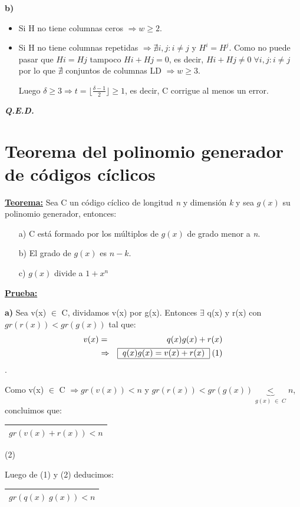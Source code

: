 \documentclass[12pt,a4paper]{report}
\newcounter{neq}
\newcommand{\QED}{\hfill \textit{\textbf{Q.E.D.}}}
\begin{document}
			\vspace{5mm}
			\textbf{b)}
			\begin{itemize}
				\item Si H no tiene columnas ceros $\Rightarrow w \geq 2$.
				\item Si H no tiene columnas repetidas $\Rightarrow \nexists i,j : i \neq j$ y $H^{i} = H^{j}$. Como no puede pasar que $H{i} = H{j}$ tampoco $H{i} + H{j} = 0$, es decir, $H{i} + H{j} \neq 0 \; \forall i,j : i \neq j$ por lo que $\nexists$ conjuntos de columnas LD $\Rightarrow w \geq 3$.

				\par Luego $\delta \geq 3 \Rightarrow t = \lfloor \frac{\delta-1}{2} \rfloor \geq 1$, es decir, C corrigue al menos un error.
			\end{itemize}

		\QED

	\section{Teorema del polinomio generador de códigos cíclicos}
		\textbf{\underline{Teorema:}} Sea C un código cíclico de longitud \textit{n} y  dimensión \textit{k} y sea $g(x)$ su polinomio generador, entonces:
			\begin{itemize}
				\item[a)] C está formado por los múltiplos de $g(x)$ de grado menor a \textit{n}.
				\item[b)] El grado de $g(x)$ es $n - k$.
				\item[c)] $g(x)$ divide a $1 + x^{n}$
			\end{itemize}

		\textbf{\underline{Prueba:}}
			\par \textbf{a)} Sea v(x) $\in$ C, dividamos v(x) por g(x). Entonces $\exists$ q(x) y r(x) con $gr(r(x)) < gr(g(x))$ tal que:
			\begin{eqnarray}
				\nonumber v(x) &=& q(x) g(x) + r(x) \\
				\nonumber & \Rightarrow & \begin{tabular}{|c|} \hline $q(x) g(x) = v(x) + r(x) $ \\ \hline \end{tabular} \; (1)
			\end{eqnarray}.

			\par Como v(x) $\in$ C $\Rightarrow gr(v(x)) < n$ y $gr(r(x)) < gr(g(x)) \underbrace{<}_{g(x) \; \in \; C} n $, concluimos que:
			\begin{center}
				\begin{tabular}{|c|} \hline $gr(v(x) + r(x)) < n $ \\ \hline \end{tabular} (2)
			\end{center}
			\par Luego de (1) y (2) deducimos: \begin{tabular}{|c|} \hline $gr(q(x) \; g(x)) < n $ \\ \hline \end{tabular}
\end{document}
